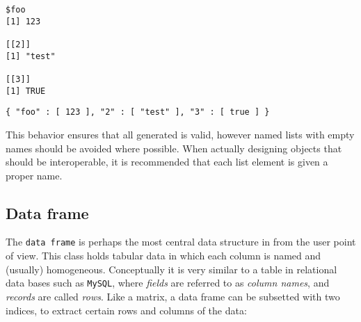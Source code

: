 \begin{knitrout}\mycodesize
{}\color{fgcolor}\begin{kframe}
\begin{alltt}
 \hlkwb{<-} \hlstd{(} \hlstd{=} \hlstd{,} \hlstd{,} \hlstd{)}
\end{alltt}
\begin{verbatim}
$foo
[1] 123

[[2]]
[1] "test"

[[3]]
[1] TRUE
\end{verbatim}
\begin{alltt}
\hlstd{(}
\end{alltt}
\begin{verbatim}
{ "foo" : [ 123 ], "2" : [ "test" ], "3" : [ true ] }
\end{verbatim}
\end{kframe}
\end{knitrout}


 This behavior ensures that all generated \JSON is valid, however named lists with empty names should be avoided where possible. When actually designing \R objects that should be interoperable, it is recommended that each list element is given a proper name.

\subsection{Data frame}

The \texttt{data frame} is perhaps the most central data structure in \R from the user point of view. This class holds tabular data in which each column is named and (usually) homogeneous. Conceptually it is very similar to a table in relational data bases such as \texttt{MySQL}, where \emph{fields} are referred to as \emph{column names}, and \emph{records} are called \emph{rows}. Like a matrix, a data frame can be subsetted with two indices, to extract certain rows and columns of the data:

